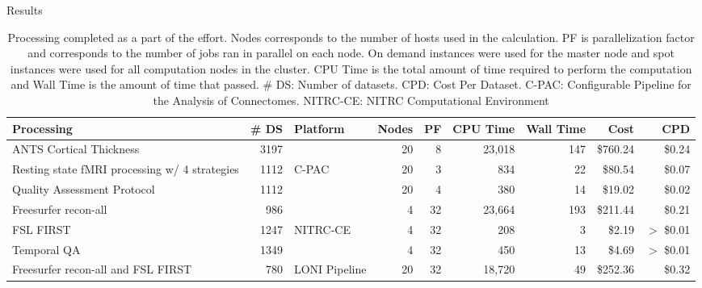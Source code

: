 \documentclass[final,hyperref={pdfpagelabels=false}]{beamer}
\newlength{\columnheight}
\begin{document}
\begin{frame}
\begin{columns}
    \begin{column}{.5\textwidth}
          \parbox[t][\columnheight]{\textwidth}{ %
            \begin{block}{Results}
				\begin{center}
			
			\begin{table}
			  \caption{Processing completed as a part of the effort. Nodes corresponds to the number of hosts used in the calculation. PF is parallelization factor and corresponds to the number of jobs ran in parallel on each node. On demand instances were used for the master node and spot instances were used for all computation nodes in the cluster. CPU Time is the total amount of time required to perform the computation and Wall Time is the amount of time that passed. \# DS: Number of datasets. CPD: Cost Per Dataset. C-PAC: Configurable Pipeline for the Analysis of Connectomes. NITRC-CE: NITRC Computational Environment}
			  \begin{tabular}{lrl*{6}{r}}
				  {\bf Processing} & {\bf \# DS} & {\bf Platform} & {\bf Nodes} & {\bf PF} & {\bf CPU Time} & {\bf Wall Time} & {\bf Cost} & {\bf CPD}\\
			      \hline
				  ANTS Cortical Thickness & 3197 &  & 20 & 8 & 23,018 & 147 & \$760.24 & \$0.24\\
			 	  Resting state fMRI processing w/ 4 strategies & 1112 & C-PAC  & 20 & 3 & 834 & 22 & \$80.54 & \$0.07 \\
				  Quality Assessment Protocol & 1112 & & 20 & 4 & 380 & 14 & \$19.02 & \$0.02 \\
				  \hline
				  Freesurfer recon-all & 986 &  & 4 & 32 & 23,664 & 193 & \$211.44 & \$0.21 \\
				  FSL FIRST & 1247 & NITRC-CE & 4 & 32 & 208 & 3 & \$2.19 & $>$ \$0.01 \\
				  Temporal QA & 1349 &  & 4 & 32 & 450 & 13 & \$4.69 & $>$ \$0.01 \\
				  \hline
				  Freesurfer recon-all and FSL FIRST & 780 & LONI Pipeline & 20 & 32 & 18,720 & 49 & \$252.36 & \$0.32 \\
			 \end{tabular}
			\end{table}
			 \end{center}
              \begin{column}{.47\textwidth}


\end{column}
\end{block}}
\end{column}
\end{columns}
\end{frame}
\end{document}
